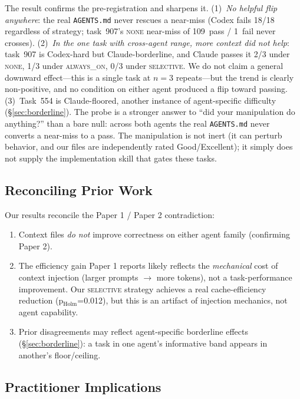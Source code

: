 \documentclass[11pt]{article}
\newcommand{\agentsmd}{\texttt{AGENTS.md}}
\newcommand{\none}{\textsc{none}}
\newcommand{\alwayson}{\textsc{always\_on}}
\newcommand{\selective}{\textsc{selective}}
\begin{document}
The result confirms the pre-registration and sharpens it.
(1)~\emph{No helpful flip anywhere}: the real \agentsmd{} never rescues a near-miss (Codex fails 18/18 regardless of strategy; task~907's \none{} near-miss of 109~pass / 1~fail never crosses).
(2)~\emph{In the one task with cross-agent range, more context did not help}: task~907 is Codex-hard but Claude-borderline, and Claude passes it 2/3 under \none{}, 1/3 under \alwayson{}, 0/3 under \selective{}. We do not claim a general downward effect---this is a single task at $n{=}3$ repeats---but the trend is clearly non-positive, and no condition on either agent produced a flip toward passing.
(3)~Task~554 is Claude-floored, another instance of agent-specific difficulty (\S\ref{sec:borderline}).
The probe is a stronger answer to ``did your manipulation do anything?'' than a bare null: across both agents the real \agentsmd{} never converts a near-miss to a pass.
The manipulation is not inert (it can perturb behavior, and our files are independently rated Good/Excellent); it simply does not supply the implementation skill that gates these tasks.

\subsection{Reconciling Prior Work}

Our results reconcile the Paper 1 / Paper 2 contradiction:
\begin{enumerate}
    \item Context files \emph{do not} improve correctness on either agent family (confirming Paper 2).
    \item The efficiency gain Paper 1 reports likely reflects the \emph{mechanical} cost of context injection (larger prompts $\to$ more tokens), not a task-performance improvement. Our \selective{} strategy achieves a real cache-efficiency reduction (p$_\text{Holm}$=0.012), but this is an artifact of injection mechanics, not agent capability.
    \item Prior disagreements may reflect agent-specific borderline effects (\S\ref{sec:borderline}): a task in one agent's informative band appears in another's floor/ceiling.
\end{enumerate}

\subsection{Practitioner Implications}
\end{document}
